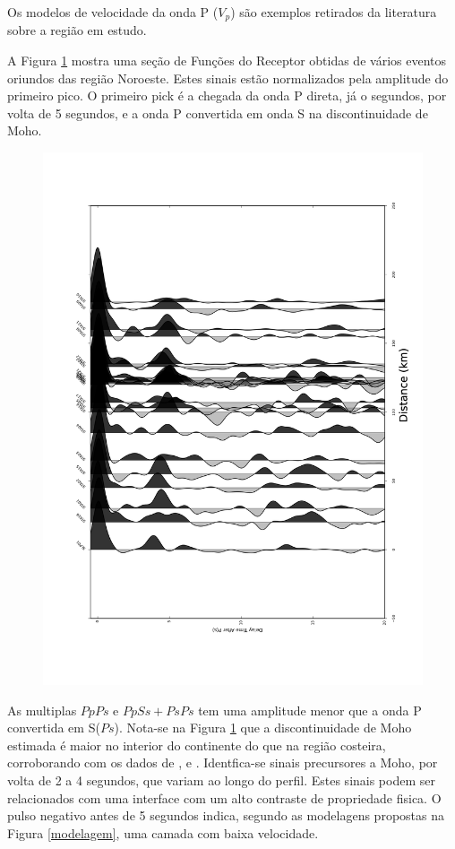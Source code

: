 Os modelos de velocidade da onda P ($V_{p}$) são exemplos retirados da literatura sobre a região em estudo. 

A Figura \ref{RF_perfil_NW} mostra uma seção de Funções do Receptor obtidas de vários eventos oriundos das região Noroeste. Estes sinais estão normalizados pela amplitude do primeiro pico. O primeiro pick é a chegada da onda P direta, já o segundos, por volta de 5 segundos, e a onda P convertida em onda S na discontinuidade de Moho.

\begin{figure}[!ht]
\centering
\includegraphics[scale=0.15]{Perfil_RF_NWLS.png}
\caption{}
\label{RF_perfil_NW}
\end{figure}


As multiplas $PpPs$ e $PpSs+PsPs$ tem uma amplitude menor que a onda P convertida em S($Ps$). Nota-se na Figura \ref{RF_perfil_NW} que a discontinuidade de Moho estimada é maior no interior do continente do que na região costeira, corroborando com os dados de \cite{Assumpcao_America_2013}, \citep{Assumpcao_Brazil_2013} e \cite{van_der_meijde_gravity_2013} . Identfica-se sinais precursores a Moho, por volta de 2 a 4 segundos, que variam ao longo do perfil. Estes sinais podem ser relacionados com uma interface com um alto contraste de propriedade fisica. O pulso negativo antes de 5 segundos indica, segundo as modelagens propostas na Figura \ref{modelagem}, uma camada com baixa velocidade.





